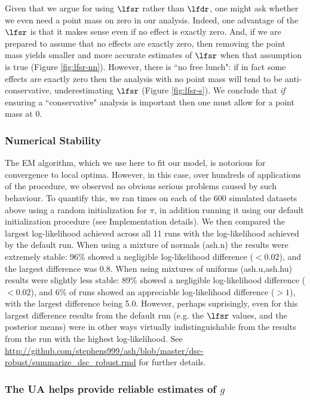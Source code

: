 Given that we argue for using $\lfsr$ rather than $\lfdr$, one might ask whether we even need a point mass on zero in our analysis.
Indeed, one advantage of the $\lfsr$ is that it makes sense even if no effect is exactly zero. And, 
if we are prepared to assume that no effects are exactly zero, then removing the point mass 
yields smaller and more accurate estimates of $\lfsr$ when that assumption is true (Figure \ref{fig:lfsr-nn}). 
However, there is ``no free lunch":  if in fact some effects are exactly zero
then the analysis with no point mass will tend to be anti-conservative, underestimating $\lfsr$ (Figure \ref{fig:lfsr-s}). 
We conclude that {\it if} ensuring a ``conservative" analysis is important then one must allow for a point mass at 0.

\subsubsection*{Numerical Stability}

The EM algorithm, which we use here to fit our model, is notorious for convergence to local optima. 
However, in this case, over hundreds of applications of the procedure, we observed no obvious serious problems 
caused by such behaviour. To quantify this, we ran  times on each of the 600 simulated datasets above using a random initialization for $\pi$,
in addition running it using our default initialization procedure (see Implementation details). We then compared the largest
log-likelihood achieved across all 11 runs with the log-likelihood achieved by the default run.
When using a mixture of normals (ash.n) the results were extremely stable: 96\% showed a negligible log-likelihood difference ($< 0.02$), 
and the largest difference was 0.8. When using mixtures of uniforms (ash.u,ash.hu) results were slightly less stable: 89\% showed a negligible log-likelihood difference ($<0.02$),
and 6\% of runs showed an appreciable log-likelihood difference ($>1$), with the largest difference being 5.0. However, perhaps suprisingly, 
even for this largest difference results from the default run (e.g. the $\lfsr$ values, and the posterior means) were in other ways virtually indistinguishable from the results from the run with the highest log-likelihood. See \url{http://github.com/stephens999/ash/blob/master/dsc-robust/summarize_dsc_robust.rmd} for further details.

\subsubsection*{The UA helps provide reliable estimates of $g$}

